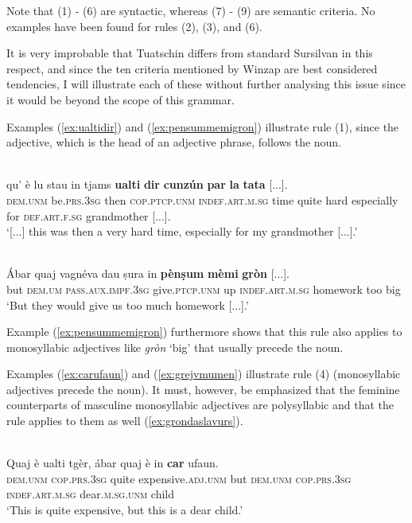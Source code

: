 Note that (1) - (6) are syntactic, whereas (7) - (9) are semantic criteria. No examples have been found for rules (2), (3), and (6).

It is very improbable that Tuatschin differs from standard Sursilvan in this respect, and since the ten criteria mentioned by Winzap are best considered tendencies, I will illustrate each of these without further analysing this issue since it would be beyond the scope of this grammar.

Examples (\ref{ex:ualtidir}) and (\ref{ex:pensummemigron}) illustrate rule (1), since the adjective, which is the head of an adjective phrase, follows the noun.
 
\ea
\label{ex:ualtidir}
\\
\gll  [...] qu’ è lu stau in tjams \textbf{ualti} \textbf{dir} \textbf{cunzún} \textbf{par} \textbf{la} \textbf{tata} [...]. \\
{} \textsc{dem.unm} be.\textsc{prs.3sg} then \textsc{cop.ptcp.unm} \textsc{indef.art.m.sg} time quite hard especially for \textsc{def.art.f.sg} grandmother [...].\\
\glt `[...] this was then a very hard time, especially for my grandmother [...].'
\z

\ea
\label{ex:pensummemigron}
\\
\gll  Ábar quaj vagnéva dau ṣura in \textbf{pènṣum} \textbf{mèmi} \textbf{gròn} [...].  \\
but \textsc{dem.um} \textsc{pass.aux.impf.3sg} give.\textsc{ptcp.unm} up \textsc{indef.art.m.sg} homework too big\\
\glt `But they would give us too much homework [...].'
\z

Example (\ref{ex:pensummemigron}) furthermore shows that this rule also applies to monosyllabic adjectives like \textit{gròn} `big' that usually precede the noun.

Examples (\ref{ex:carufaun}) and (\ref{ex:grejvmumen}) illustrate rule (4) (monosyllabic adjectives precede the noun). It must, however, be emphasized that the feminine counterparts of masculine monosyllabic adjectives are polysyllabic and that the rule applies to them as well (\ref{ex:grondaslavurs}).

\ea
\label{ex:carufaun}
\\
\gll Quaj è ualti tgèr, ábar quaj è in \textbf{car} ufaun.\\
\textsc{dem.unm} \textsc{cop.prs.3sg} quite expensive.\textsc{adj.unm} but \textsc{dem.unm} \textsc{cop.prs.3sg} \textsc{indef.art.m.sg} dear.\textsc{m.sg.unm} child\\
\glt `This is quite expensive, but this is a dear child.'
\z 

